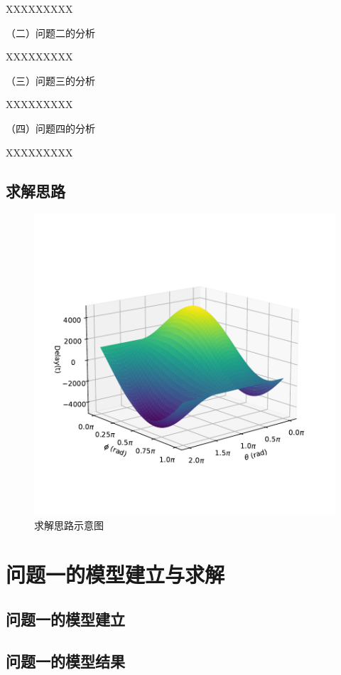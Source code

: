 \documentclass[12pt,a4paper]{article}
\begin{document}
XXXXXXXXX

（二）问题二的分析

XXXXXXXXX

（三）问题三的分析

XXXXXXXXX

（四）问题四的分析

XXXXXXXXX

\subsection{求解思路}

\begin{figure}[htbp]
    \centering
    \includegraphics[width=0.9\linewidth,trim=20 50 0 50, clip]{src/Geo_3d.pdf}
    \caption{求解思路示意图}
    \label{fig:求解思路}
\end{figure}


\clearpage
\section{问题一的模型建立与求解}
\subsection{问题一的模型建立}


\subsection{问题一的模型结果}\label{问题一的模型结果}
\end{document}
